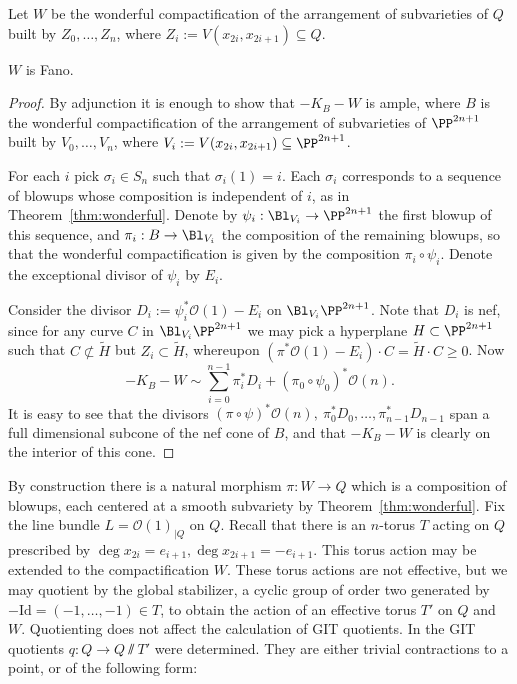 Let \(W\) be the wonderful compactification of the arrangement of subvarieties of \(Q\) built by \(Z_0,\dots,Z_n\), where \(Z_i := V(x_{2i},x_{2i+1}) \subseteq Q\).
\begin{lemma}
\(W\) is Fano.
\end{lemma}
\begin{proof}
By adjunction it is enough to show that \(-K_B - W\) is ample, where \(B\) is the wonderful compactification of the arrangement of subvarieties of \(\PP^{2n+1}\) built by \(V_0,\dots,V_n\), where \(V_i := V(x_{2i},x_{2i+1}) \subseteq \PP^{2n+1}\).

For each \(i\) pick \(\sigma_i \in S_n\) such that \(\sigma_i(1) = i\). Each \(\sigma_i\) corresponds to a sequence of blowups whose composition is independent of \(i\), as in Theorem~\ref{thm:wonderful}. Denote by \( \psi_i: \Bl_{V_i} \to \PP^{2n+1}\) the first blowup of this sequence, and \(\pi_i: B \to \Bl_{V_i}\) the composition of the remaining blowups, so that the wonderful compactification is given by the composition \(\pi_i \circ \psi_i\). Denote the exceptional divisor of \(\psi_i\) by \(E_i\).

Consider the divisor \(D_i := \psi_i^* \mathcal{O}(1) - E_i\) on \(\Bl_{V_i} \PP^{2n+1}\). Note that \(D_i\) is nef, since for any curve \(C\) in \(\Bl_{V_i} \PP^{2n+1}\) we may pick a hyperplane \(H \subset \PP^{2n+1} \) such that \(C \not\subset \tilde{H}\) but \(Z_i \subset \tilde{H}\), whereupon \((\pi^* \mathcal{O}(1) - E_i) \cdot C = \tilde{H} \cdot C \ge 0\).
Now
\[
-K_B - W \sim  \sum_{i=0}^{n-1} \pi_i^* D_i + (\pi_0 \circ \psi_0)^* \mathcal{O}(n).
\]
It is easy to see that the divisors \((\pi \circ \psi)^* \mathcal{O}(n), \ \pi_0^* D_0, \dots, \pi_{n-1}^* D_{n-1} \) span a full dimensional subcone of the nef cone of \(B\), and that \(-K_B - W\) is clearly on the interior of this cone.
\end{proof}
By construction there is a natural morphism \(\pi: W \to Q\) which is a composition of blowups, each centered at a smooth subvariety by Theorem~\ref{thm:wonderful}. Fix the line bundle \(L = \mathcal{O}(1)_{|Q} \) on \(Q\). Recall that there is an \(n\)-torus \(T\) acting on \(Q\) prescribed by \(\deg x_{2i} = e_{i+1}, \deg x_{2i+1} = -e_{i+1}\). This torus action may be extended to the compactification \(W\). These torus actions are not effective, but we may quotient by the global stabilizer, a cyclic group of order  two generated by \(-\text{Id} = (-1,\dots,-1) \in T\), to obtain the action of an effective torus \(T'\) on \(Q\) and \(W\). Quotienting does not affect the calculation of GIT quotients. In \cite{suess18-2} the GIT quotients \(q: Q \to Q \sslash T'\) were determined. They are either trivial contractions to a point, or of the following form:
